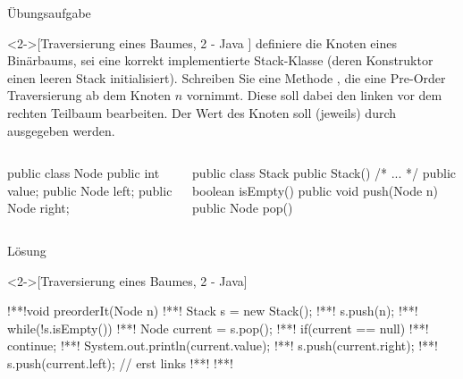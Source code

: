 \begin{frame}[fragile,c]{Übungsaufgabe}
    \begin{exercise}<2->[Traversierung eines Baumes, 2 - Java ]
         definiere die Knoten eines Binärbaums,  sei eine korrekt implementierte Stack-Klasse (deren Konstruktor einen leeren Stack initialisiert).\pause{} Schreiben Sie eine  Methode , die eine Pre-Order Traversierung ab dem Knoten \(n\) vornimmt. Diese soll dabei den linken vor dem rechten Teilbaum bearbeiten.\pause{} Der Wert des Knoten soll (jeweils) durch  ausgegeben werden.\pause{}
\begin{columns}[c]
%
\begin{column}{.42\linewidth}
\begin{plainjava}
public class Node {
    public int value;
    public Node left;
    public Node right;
}
\end{plainjava}
\end{column}
\begin{column}{.48\linewidth}
    \begin{plainjava}[morekeywords={[3]{Stack}}]
public class Stack {
    public Stack() {/* ... */}
    public boolean isEmpty() {}
    public void push(Node n) {}
    public Node pop() {}
}
\end{plainjava}
\end{column}
\end{columns}
    \end{exercise}
\end{frame}

\begin{frame}[fragile,c]{Lösung}
    \begin{solve}<2->[Traversierung eines Baumes, 2 - Java]
\begin{plainjava}[morekeywords={[3]{Stack}}]
!**!void preorderIt(Node n) {
!**!    Stack s = new Stack();
!**!    s.push(n);
!**!    while(!s.isEmpty()) {
!**!        Node current = s.pop();
!**!        if(current == null)
!**!            continue;
!**!        System.out.println(current.value);
!**!        s.push(current.right);
!**!        s.push(current.left); // erst links
!**!    }
!**!}
\end{plainjava}
    \end{solve}
\end{frame}

